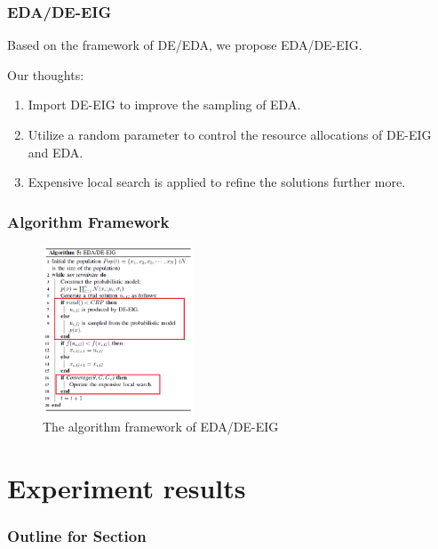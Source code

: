 \documentclass[xcolor=dvipsnames]{beamer}
\begin{document}
    \begin{frame}
    \frametitle{EDA/DE-EIG}
    Based on the framework of DE/EDA, we propose EDA/DE-EIG.

    Our thoughts:
    \begin{enumerate}
    \item Import DE-EIG to improve the sampling of EDA.
    \item Utilize a random parameter to control the resource allocations of DE-EIG and EDA.
    \item Expensive local search is applied to refine the solutions further more.
    \end{enumerate}

    \end{frame}

    \begin{frame}
    \frametitle{Algorithm Framework}
    \begin{figure}[H]
    \graphicspath{{figs/}}
    \includegraphics[width=0.4\textwidth]{deeda-eig.png}
    \caption{The algorithm framework of EDA/DE-EIG}
    \end{figure}
    \end{frame}



    \section{Experiment results}
    \begin{frame}
      \frametitle{Outline for Section \thesection}
      \tableofcontents[currentsection]
    \end{frame}
\end{document}
